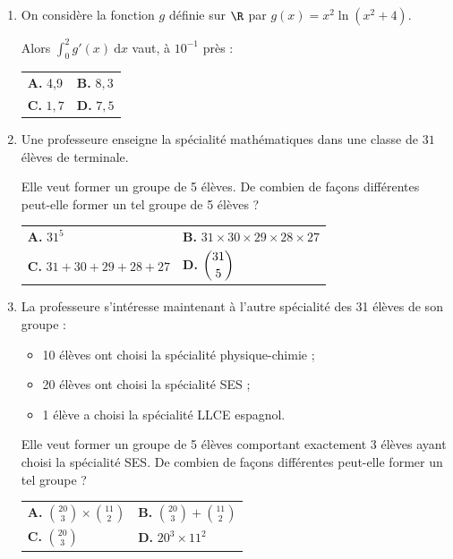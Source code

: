 \begin{enumerate}
\item On considère la fonction $g$ définie sur $\R$ par $g(x) = x^2 \ln \left(x^2 + 4\right) $.

Alors $\displaystyle\int_0^2 g'(x)\:\text{d}x$ vaut, à $10^{-1}$ près :

\begin{center}
\begin{tabularx}{\linewidth}{X X}
\textbf{A. } 4,9&\textbf{B. } $8,3$\\
\textbf{C. } $1,7$&\textbf{D. } $7,5$
\end{tabularx}
\end{center}	
	\smallskip
	
\item Une professeure enseigne la spécialité mathématiques dans une classe de $31$ élèves de terminale.
	
Elle veut former un groupe de 5 élèves. De combien de façons différentes peut-elle former 
un tel groupe de 5 élèves ?

\begin{center}
\begin{tabularx}{\linewidth}{X X}
\textbf{A. } $31^5$&\textbf{B. } $31\times30\times29\times28\times27$\\
\textbf{C. } $31+30+29+28+27$&\textbf{D. } $\dbinom{31}{5}$
\end{tabularx}
\end{center}

	\item La professeure s'intéresse maintenant à l'autre spécialité des 31 élèves de son groupe :
	
\begin{itemize}
	\item 10 élèves ont choisi la spécialité physique-chimie ;
	\item 20 élèves ont choisi la spécialité SES ;
	\item 1 élève a choisi la spécialité LLCE espagnol.
\end{itemize}
	
Elle veut former un groupe de 5 élèves comportant exactement 3 élèves ayant choisi la
	spécialité SES. De combien de façons différentes peut-elle former un tel groupe ?
	
\begin{center}
\renewcommand\arraystretch{1.9}
\begin{tabularx}{\linewidth}{X X}
\textbf{A. } $\displaystyle\binom{20}{3} \times \binom{11}{2}$&\textbf{B. } $\displaystyle\binom{20}{3} + \binom{11}{2}$\\
\textbf{C. } $\displaystyle\binom{20}{3}$&\textbf{D. } $20^3 \times 11^2$
\end{tabularx}
\end{center}
\end{enumerate}

\bigskip
